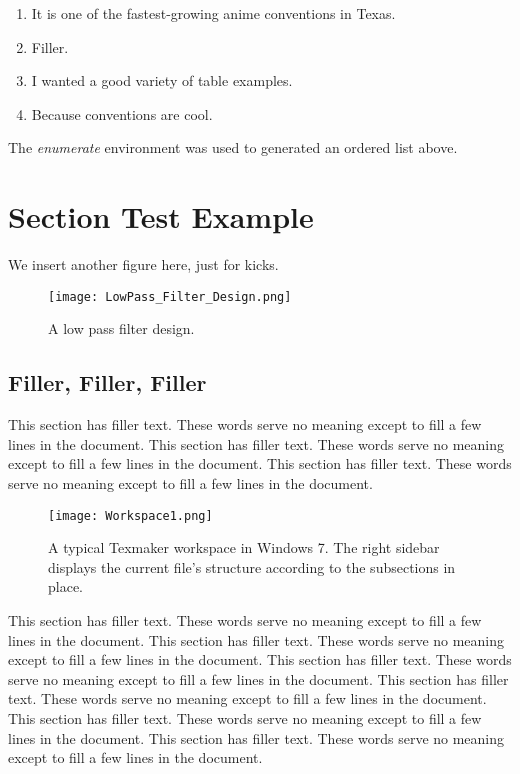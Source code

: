 \begin{enumerate}
\item It is one of the fastest-growing anime conventions in Texas.
\item Filler.
\item I wanted a good variety of table examples.
\item Because conventions are cool.
\end{enumerate}

The \textit{enumerate} environment was used to generated an ordered list above.

\section{Section Test Example}
We insert another figure here, just for kicks.

\begin{figure}[h!]
	\centering
	\texttt{[image: LowPass\_Filter\_Design.png]}
	\caption{A low pass filter design.}
\end{figure}

\subsection{Filler, Filler, Filler}

This section has filler text. These words serve no meaning except to fill a few lines in the document. This section has filler text. These words serve no meaning except to fill a few lines in the document. This section has filler text. These words serve no meaning except to fill a few lines in the document.

\begin{figure}[h!]
	\centering
	\texttt{[image: Workspace1.png]}
	\caption{A typical Texmaker workspace in Windows 7. The right sidebar displays the current file's structure according to the subsections in place.}
\end{figure}

This section has filler text. These words serve no meaning except to fill a few lines in the document. This section has filler text. These words serve no meaning except to fill a few lines in the document. This section has filler text. These words serve no meaning except to fill a few lines in the document. This section has filler text. These words serve no meaning except to fill a few lines in the document. This section has filler text. These words serve no meaning except to fill a few lines in the document. This section has filler text. These words serve no meaning except to fill a few lines in the document.

